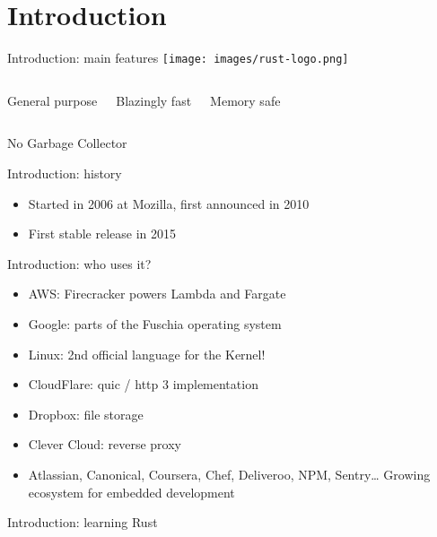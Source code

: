 \section{Introduction}

    \begin{frame}{Introduction: main features}
        \centering
        \texttt{[image: images/rust-logo.png]}
        \vspace{1cm}

        \begin{columns}[t, onlytextwidth]
            \centering
            General purpose

            \centering
            Blazingly fast

            \centering
            Memory safe
        \end{columns}

        \vspace{1cm}

        No Garbage Collector
    \end{frame}

    \begin{frame}{Introduction: history}
        \begin{itemize}
            \item Started in 2006 at Mozilla, first announced in 2010
            \item First stable release in 2015
        \end{itemize}
    \end{frame}

    \begin{frame}{Introduction: who uses it?}
        \begin{itemize}
            \item AWS: Firecracker powers Lambda and Fargate
            \item Google: parts of the Fuschia operating system
            \item Linux: 2nd official language for the Kernel!
            \item CloudFlare: quic / http 3 implementation
            \item Dropbox: file storage
            \item Clever Cloud: reverse proxy
            \item Atlassian, Canonical, Coursera, Chef, Deliveroo, NPM, Sentry…
            Growing ecosystem for embedded development
        \end{itemize}
    \end{frame}

    \begin{frame}{Introduction: learning Rust}
        
    \end{frame}
